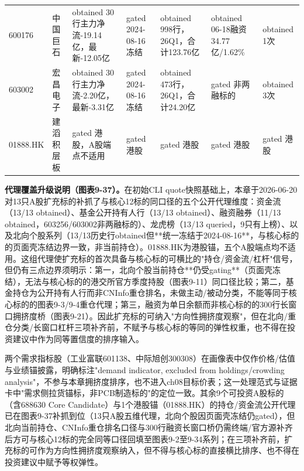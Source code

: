 \begin{exhibitbox}
\begin{tabularx}{\textwidth}{L{1.4cm}L{1.5cm}X X X X X}
600176 & 中国巨石 & obtained 30行主力净流-19.14亿，最新-12.05亿 & gated 2024-08-16冻结 & obtained 998行，26Q1，合计123.76亿 & obtained 06-18融资34.77亿/1.62\% & obtained 1次 \\
603002 & 宏昌电子 & obtained 30行主力净流-2.20亿，最新-3.31亿 & gated 2024-08-16冻结 & obtained 473行，26Q1，合计24.20亿 & gated 非两融标的 & obtained 3次 \\
01888.HK & 建滔积层板 & gated 港股，A股端点不适用 & gated 港股 & gated 港股 & gated 港股 & gated 港股 \\
\bottomrule
\end{tabularx}
\end{exhibitbox}

\textbf{代理覆盖升级说明（图表9-37）。}在初始CLI quote快照基础上，本章于2026-06-20对13只A股扩充标的补抓了与核心12标的同口径的五个公开代理维度：资金流（13/13 obtained）、基金公开持有人行（13/13 obtained）、融资融券（11/13 obtained，603256/603002非两融标的）、龙虎榜（13/13 queried，9只有上榜）、以及北向个股系列（13/13历史行obtained但**统一冻结于2024-08-16**，与核心标的的页面壳冻结边界一致，非当前持仓）。01888.HK为港股锚，五个A股端点均不适用。这组代理使扩充标的首次具备与核心标的可横比的"持仓/资金流/杠杆"信号，但仍有三点边界须明示：第一，北向个股当前持仓**仍受gating**（页面壳冻结），无法与核心标的的港交所官方季度持股（图表9-11）同口径比较；第二，基金持仓为公开持有人行而非CNInfo重仓排名，未做主动/被动分类，不能等同于核心标的的图表9-3/9-4重仓代理；第三，融资为单日余额而非核心标的的300行长窗口拥挤度桥（图表9-21）。因此扩充标的可纳入"方向性拥挤度观察"，但在北向/重仓分类/长窗口杠杆三项补齐前，不赋予与核心标的等同的弹性权重，也不得在投资建议中作为同等置信度的排序输入。

两个需求指标股（工业富联601138、中际旭创300308）在画像表中仅作价格/估值与业绩锚披露，明确标注"demand indicator, excluded from holdings/crowding analysis"，不参与本章拥挤度排序，也不进入ch08目标价表；这一处理范式与证据卡中"需求侧拉货锚标，非PCB制造标的"的定位一致。其余9个可投资A股标的（含688630 Core Candidate）与1个港股锚（01888.HK）的持仓/资金流公开代理已在图表9-37补抓到位（13只A股五维代理，北向个股因页面壳冻结仍gated），但北向当前持仓、CNInfo重仓排名口径与300行融资长窗口桥仍需终端/官方源补齐后方可与核心12标的完全同等口径回填至图表9-2至9-34系列；在三项补齐前，扩充标的可作为方向性拥挤度观察纳入，但不得与核心标的直接横比排序、也不得在投资建议中赋予等权弹性。

